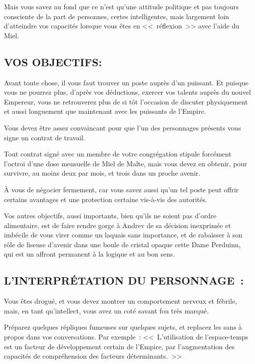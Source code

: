 \documentclass[14pt,twocolumn]{extarticle}
\begin{document}
Mais vous savez au fond que ce n'est qu'une attitude politique et pas toujours
consciente de la part de personnes, certes intelligentes, mais largement loin
d'atteindre vos capacités lorsque vous êtes en <<~réflexion~>> avec l'aide du
Miel.

\subsection{VOS OBJECTIFS:}

Avant toute chose, il vous faut trouver un poste auprès d'un puissant. Et
puisque vous ne pourrez plus, d'après vos déductions, exercer vos talents
auprès du nouvel Empereur, vous ne retrouverez plus de si tôt l'occasion de
discuter physiquement et aussi longuement que maintenant avec les puissants de
l'Empire.

Vous devez être assez convaincant pour que l'un des personnages présents vous
signe un contrat de travail.

Tout contrat signé avec un membre de votre congrégation stipule forcément
l'octroi d'une dose mensuelle de Miel de Malte, mais vous devez en obtenir,
pour survivre, au moins deux par mois, et trois dans un proche avenir.

À vous de négocier fermement, car vous savez aussi qu'un tel poste peut offrir
certains avantages et une protection certaine vis-à-vis des autorités.

Vos autres objectifs, aussi importants, bien qu'ils ne soient pas d'ordre
alimentaire, est de faire rendre gorge à Andrev de sa décision inexprimée et
imbécile de vous virer comme un laquais sans importance, et de rabaisser à son
rôle de liseuse d'avenir dans une boule de cristal opaque cette Dame Perduinn,
qui est un affront permanent à la logique et au bon sens.

\subsection{L'INTERPRÉTATION DU PERSONNAGE~:}

Vous êtes drogué, et vous devez montrer un comportement nerveux et fébrile,
mais, en tant qu'intellect, vous avez un coté savant fou très marqué.

Préparez quelques répliques fumeuses sur quelques sujets, et replacez les sans
à propos dans vos conversations. Par exemple~: <<~L'utilisation de
l'espace-temps est un facteur de développement certain de l'Empire, par
l'augmentation des capacités de compréhension des facteurs déterminants.~>>
\end{document}
